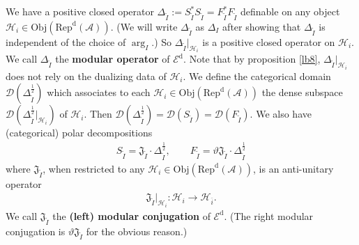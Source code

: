 \documentclass[12pt,a4paper]{article}
\theoremstyle{definition}
\theoremstyle{plain}
\newcommand{\fk}{\mathfrak}
\newcommand{\mc}{\mathcal}
\newcommand{\wtd}{\widetilde}
\newcommand{\ovl}{\overline}
\newcommand{\Dom}{\scr D}
\newcommand{\scr}{\mathscr}
\newcommand{\RepdA}{\mathrm{Rep}^{\mathrm d}(\mc A)}
\newcommand{\Obj}{\mathrm{Obj}}
\newcommand{\Ed}{\mathscr E^{\mathrm d}}
\numberwithin{equation}{section}
\begin{document}
We have a positive closed operator $\Delta_{\wtd I}:=S_{\wtd I}^*S_{\wtd I}=F_{\wtd I}^*F_{\wtd I}$ definable on any object $\mc H_i\in\Obj(\RepdA)$. (We will write $\Delta_{\wtd I}$ as $\Delta_I$ after showing that $\Delta_{\wtd I}$ is independent of the choice of $\arg_I$.) So $\Delta_{\wtd I}|_{\mc H_i}$ is a positive closed operator on $\mc H_i$. We call $\Delta_{\wtd I}$ the  \textbf{modular operator} of $\Ed$. Note that by proposition \ref{lb8}, $\Delta_{\wtd I}|_{\mc H_i}$ does not rely on the dualizing data of $\mc H_i$. We define the categorical domain $\Dom(\Delta_{\wtd I}^{\frac 12})$ which associates to each $\mc H_i\in\Obj(\RepdA)$ the dense subspace $\Dom(\Delta_{\wtd I}^{\frac 12}|_{\mc H_i})$ of $\mc H_i$. Then $\Dom(\Delta_{\wtd I}^{\frac 12})=\Dom(S_{\wtd I})=\Dom(F_{\wtd I})$. We also have (categorical) polar decompositions
\begin{align}
	S_{\wtd I}=\fk J_{\wtd I}\cdot\Delta_{\wtd I}^{\frac 12},\qquad F_{\wtd I}=\vartheta\fk J_{\wtd I}\cdot\Delta_{\wtd I}^{\frac 12}\label{eq41}
\end{align}
where $\fk J_{\wtd I}$, when restricted to any $\mc H_i\in\Obj(\RepdA)$, is an anti-unitary operator
\begin{align*}
	\fk J_{\wtd I}|_{\mc H_i}:\mc H_i\rightarrow\mc H_{\ovl i}.
\end{align*}
We call $\fk J_{\wtd I}$ the  \textbf{(left) modular conjugation} of $\Ed$. (The right modular conjugation is $\vartheta\fk J_{\wtd I}$ for the obvious reason.) 
\end{document}
